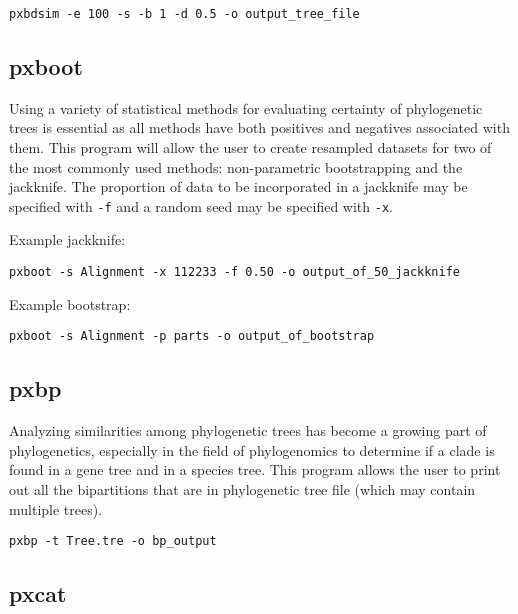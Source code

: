 \documentclass[12pt,letterpaper]{memoir}
\begin{document}
\begin{flushleft}
\begin{verbatim}
pxbdsim -e 100 -s -b 1 -d 0.5 -o output_tree_file
\end{verbatim}
\end{flushleft}

\subsection{pxboot}

Using a variety of statistical methods for evaluating certainty of phylogenetic trees is essential as all methods have both positives and negatives associated with them. This program will allow the user to create resampled datasets for two of the most commonly used methods: non-parametric bootstrapping and the jackknife. The proportion of data to be incorporated in a jackknife may be specified with \texttt{-f} and a random seed may be specified with \texttt{-x}.

\begin{flushleft}
Example jackknife:
\begin{verbatim}
pxboot -s Alignment -x 112233 -f 0.50 -o output_of_50_jackknife
\end{verbatim}
Example bootstrap:
\begin{verbatim}
pxboot -s Alignment -p parts -o output_of_bootstrap
\end{verbatim}
\end{flushleft}

\subsection{pxbp}

Analyzing similarities among phylogenetic trees has become a growing part of phylogenetics, especially in the field of phylogenomics to determine if a clade is found in a gene tree and in a species tree. This program allows the user to print out all the bipartitions that are in phylogenetic tree file (which may contain multiple trees).

\begin{flushleft}
\begin{verbatim}
pxbp -t Tree.tre -o bp_output
\end{verbatim}
\end{flushleft}

\subsection{pxcat}
\end{document}
